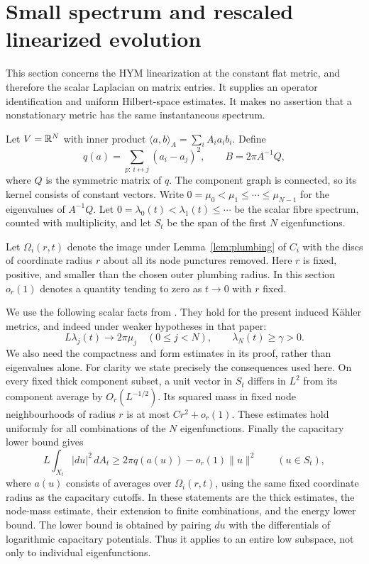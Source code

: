 \section{Small spectrum and rescaled linearized evolution}\label{sec:spectrum}

This section concerns the HYM linearization at the constant flat metric,
and therefore the scalar Laplacian on matrix entries. It supplies an
operator identification and uniform Hilbert-space estimates. It makes no
assertion that a nonstationary metric has the same instantaneous spectrum.

Let $V=\mathbb R^N$ with inner product
$\langle a,b\rangle_A=\sum_iA_i a_i b_i$. Define
\[
 q(a)=\sum_{p:\,i\leftrightarrow j}(a_i-a_j)^2,
 \qquad B=2\pi A^{-1}Q,
\]
where $Q$ is the symmetric matrix of $q$. The component graph is connected,
so its kernel consists of constant vectors. Write
$0=\mu_0<\mu_1\le\cdots\le\mu_{N-1}$ for the eigenvalues of
$A^{-1}Q$. Let $0=\lambda_0(t)<\lambda_1(t)\le\cdots$ be the
scalar fibre spectrum, counted with multiplicity, and let $S_t$ be the
span of the first $N$ eigenfunctions.

Let $\Omega_i(r,t)$ denote the image under Lemma~\ref{lem:plumbing}
of $C_i$ with the discs of coordinate radius $r$ about all its node
punctures removed. Here $r$ is fixed, positive, and smaller than the
chosen outer plumbing radius. In this section $o_r(1)$ denotes a quantity
tending to zero as $t\to0$ with $r$ fixed.

We use the following scalar facts from \cite{wuebben-curves}. They hold
for the present induced K\"ahler metrics, and indeed under weaker
hypotheses in that paper:
\begin{equation}\label{eq:scalar-law}
 L\lambda_j(t)\longrightarrow2\pi\mu_j\quad(0\le j<N),
 \qquad\lambda_N(t)\ge\gamma>0.
\end{equation}
We also need the compactness and form estimates in its proof, rather
than eigenvalues alone. For clarity we state precisely the consequences
used here. On every fixed thick component subset, a unit vector in $S_t$
differs in $L^2$ from its component average by $O_r(L^{-1/2})$.
Its squared mass in fixed node neighbourhoods of radius $r$ is at
most $Cr^2+o_r(1)$. These estimates hold uniformly for all combinations
of the $N$ eigenfunctions. Finally the capacitary lower bound gives
\begin{equation}\label{eq:scalar-form-lower}
 L\int_{X_t}|du|^2\,dA_t
 \ge2\pi q(a(u))-o_r(1)\|u\|^2\qquad(u\in S_t),
\end{equation}
where $a(u)$ consists of averages over $\Omega_i(r,t)$, using the
same fixed coordinate radius as the capacitary cutoffs.
In \cite[Section~4]{wuebben-curves} these statements
are the thick estimates, the node-mass estimate, their extension to
finite combinations, and the energy lower bound. The lower bound is
obtained by pairing $du$ with the differentials of logarithmic
capacitary potentials. Thus it applies to an entire low subspace,
not only to individual eigenfunctions.

